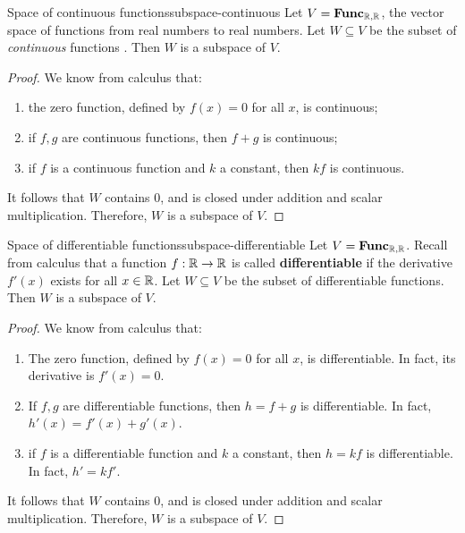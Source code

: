 \begin{example}{Space of continuous functions}{subspace-continuous}
  Let $V = \mathbf{Func}_{\mathbb{R},\mathbb{R}}$, the vector space of functions from real numbers to
  real numbers. Let $W\subseteq V$ be the subset of {\em continuous}
  functions%
  . Then $W$ is a subspace of\/ $V$.
\end{example}

\begin{proof}
  We know from calculus that:
  \begin{enumerate}
  \item the zero function, defined by $f(x)=0$ for all $x$, is
    continuous;
  \item if $f,g$ are continuous functions, then $f+g$ is
    continuous;
  \item if $f$ is a continuous function and $k$ a constant, then $kf$
    is continuous.
  \end{enumerate}
  It follows that $W$ contains $0$, and is closed under addition and
  scalar multiplication. Therefore, $W$ is a subspace of\/ $V$.
\end{proof}

\begin{example}{Space of differentiable functions}{subspace-differentiable}
  Let $V = \mathbf{Func}_{\mathbb{R},\mathbb{R}}$. Recall from calculus that a function
  $f:\mathbb{R}\to\mathbb{R}$ is called \textbf{differentiable}%
   if the derivative $f'(x)$ exists for
  all $x\in\mathbb{R}$. Let $W\subseteq V$ be the subset of differentiable
  functions. Then $W$ is a subspace of\/ $V$.
\end{example}

\begin{proof}
  We know from calculus that:
  \begin{enumerate}
  \item The zero function, defined by $f(x)=0$ for all $x$, is
    differentiable. In fact, its derivative is $f'(x) = 0$.
  \item If $f,g$ are differentiable functions, then $h=f+g$ is
    differentiable. In fact, $h'(x) = f'(x) + g'(x)$.
  \item if $f$ is a differentiable function and $k$ a constant, then
    $h=kf$ is differentiable. In fact, $h' = kf'$.
  \end{enumerate}
  It follows that $W$ contains $0$, and is closed under addition and
  scalar multiplication. Therefore, $W$ is a subspace of\/ $V$.
\end{proof}

